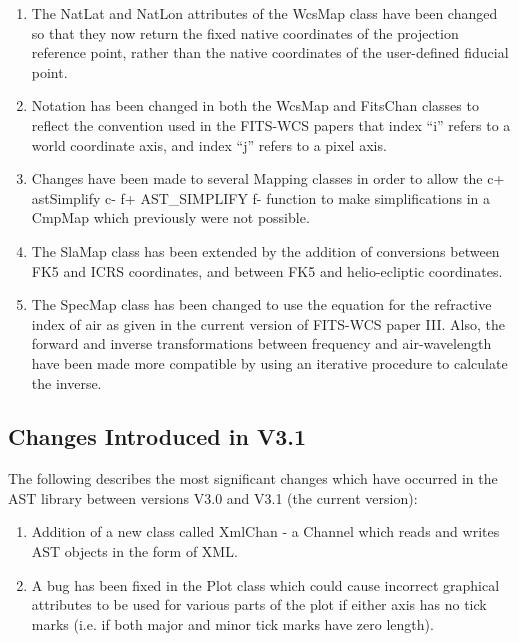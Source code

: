 \documentclass[twoside,11pt]{article}
\begin{document}
\begin{enumerate}
\item The NatLat and NatLon attributes of the WcsMap class have been
changed so that they now return the fixed native coordinates of the
projection reference point, rather than the native coordinates of the
user-defined fiducial point.

\item Notation has been changed in both the WcsMap and FitsChan classes to
reflect the convention used in the FITS-WCS papers that index ``i'' refers
to a world coordinate axis, and index ``j'' refers to a pixel axis.

\item Changes have been made to several Mapping classes in order to allow
the
c+
astSimplify
c-
f+
AST\_SIMPLIFY
f-
function to make simplifications in a CmpMap which previously were not
possible.

\item The SlaMap class has been extended by the addition of conversions
between FK5 and ICRS coordinates, and between FK5 and helio-ecliptic coordinates.

\item The SpecMap class has been changed to use the equation for the
refractive index of air as given in the current version of FITS-WCS paper
III. Also, the forward and inverse transformations between frequency and
air-wavelength have been made more compatible by using an iterative
procedure to calculate the inverse.

\end{enumerate}

\subsection{Changes Introduced in V3.1}

The following describes the most significant changes which have
occurred in the AST library between versions V3.0 and V3.1 (the
current version):

\begin{enumerate}
\item Addition of a new class called XmlChan - a Channel which
reads and writes AST objects in the form of XML.
\item A bug has been fixed in the Plot class which could cause incorrect
graphical attributes to be used for various parts of the plot if either
axis has no tick marks (i.e. if both major and minor tick marks have zero
length).
\end{enumerate}
\end{document}
